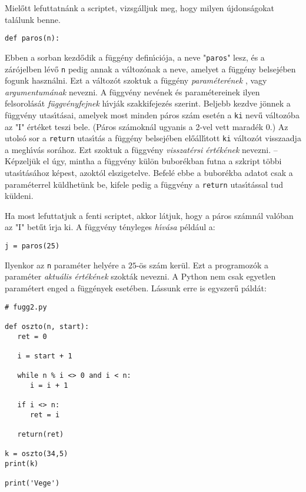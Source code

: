 \documentclass[12pt]{article}
\begin{document}
Miel\H{o}tt lefuttatn\'ank a scriptet, vizsg\'alljuk meg, hogy milyen \'ujdons\'agokat ta\-l\'a\-lunk benne.  

\begin{Verbatim}[fontsize=\small]
def paros(n):
\end{Verbatim}

Ebben a sorban kezd\H{o}dik a f\"ugg\'eny defin\'{\i}ci\'oja, a neve "{\tt paros}" lesz, \'es a z\'ar\'ojel\-ben 
l\'ev\H{o} {\tt n} pedig annak a v\'altoz\'onak a neve, amelyet a f\"ugg\'eny belsej\'eben fogunk haszn\'alni. 
Ezt a v\'altoz\'ot szoktuk a f\"ugg\'eny {\sl param\'eter\'enek} , vagy {\sl argumentum\'anak} 
nevezni. A 
f\"uggv\'eny nev\'enek \'es param\'etereinek ilyen felsorol\'as\'at {\sl f\"uggv\'enyfejnek} h\'{\i}vj\'ak 
szakkifejez\'es szerint. Beljebb kezdve j\"onnek a f\"uggv\'eny utas\'{\i}t\'asai, amelyek most minden p\'aros 
sz\'am eset\'en a {\tt ki} nev\H{u} v\'altoz\'oba az "I" \'ert\'eket teszi bele. (P\'aros sz\'amokn\'al 
ugyanis a 2-vel vett marad\'ek 0.) Az utols\'o sor a {\tt return} utas\'{\i}t\'as a f\"ugg\'eny belsej\'eben 
el\H{o}\'all\'{\i}tott 
{\tt ki} v\'altoz\'ot visszaadja a megh\'{\i}v\'as sor\'ahoz. Ezt szoktuk a f\"uggv\'eny {\sl visszat\'ersi 
\'ert\'ek\'enek} nevezni. -- K\'epzelj\"uk el \'ugy, mintha a f\"uggv\'eny k\"ul\"on bubor\'ekban futna a 
szkript t\"obbi utas\'{\i}t\'as\'ahoz k\'epest, azokt\'ol elszigetelve. Befel\'e ebbe a bubor\'ekba adatot 
csak a param\'eterrel k\"uldhet\"unk be, kifele pedig a f\"uggv\'eny a {\tt return} utas\'{\i}t\'assal tud 
k\"uldeni.

Ha most lefuttatjuk a fenti scriptet, akkor l\'atjuk, hogy a p\'aros sz\'amn\'al val\'oban az "I" bet\H{u}t 
\'{\i}rja ki. A f\"uggv\'eny t\'enyleges {\sl h\'{\i}v\'asa}  p\'eld\'aul a: 

\begin{Verbatim}[fontsize=\small]
j = paros(25)
\end{Verbatim}

Ilyenkor az {\tt n} param\'eter hely\'ere a $25$-\"os sz\'am ker\"ul. Ezt a programoz\'ok a param\'eter 
{\sl aktu\'alis \'ert\'ek\'enek}  szokt\'ak nevezni. A Python nem csak egyetlen 
param\'etert enged a f\"ugg\'enyek eset\'eben. L\'assunk erre is egyszer\H{u} p\'ald\'at:

\begin{Verbatim}[fontsize=\small]
# fugg2.py

def oszto(n, start):
   ret = 0

   i = start + 1

   while n % i <> 0 and i < n:
      i = i + 1

   if i <> n:
      ret = i

   return(ret)

k = oszto(34,5)
print(k)

print('Vege')  
\end{Verbatim}
\end{document}

